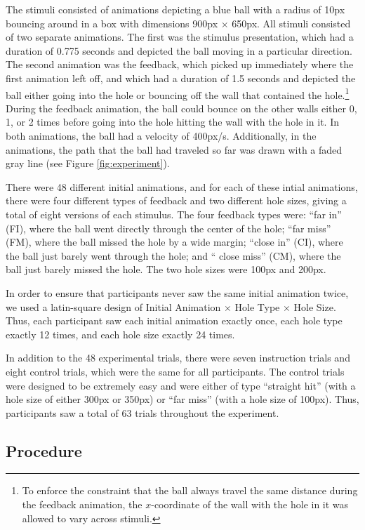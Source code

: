 \documentclass[10pt,letterpaper]{article}
\begin{document}
The stimuli consisted of animations depicting a blue ball with a radius of 10px bouncing around in a box with dimensions 900px $\times$ 650px. All stimuli consisted of two separate animations. The first was the stimulus presentation, which had a duration of 0.775 seconds and depicted the ball moving in a particular direction. The second animation was the feedback, which picked up immediately where the first animation left off, and which had a duration of 1.5 seconds and depicted the ball either going into the hole or bouncing off the wall that contained the hole.\footnote{To enforce the constraint that the ball always travel the same distance during the feedback animation, the $x$-coordinate of the wall with the hole in it was allowed to vary across stimuli.} During the feedback animation, the ball could bounce on the other walls either 0, 1, or 2 times before going into the hole hitting the wall with the hole in it. In both animations, the ball had a velocity of 400px/s. Additionally, in the animations, the path that the ball had traveled so far was drawn with a faded gray line (see Figure \ref{fig:experiment}).

There were 48 different initial animations, and for each of these intial animations, there were four different types of feedback and two different hole sizes, giving a total of eight versions of each stimulus. The four feedback types were: ``far in'' (FI), where the ball went directly through the center of the hole; ``far miss'' (FM), where the ball missed the hole by a wide margin; ``close in'' (CI), where the ball just barely went through the hole; and `` close miss'' (CM), where the ball just barely missed the hole. The two hole sizes were 100px and 200px.

In order to ensure that participants never saw the same initial animation twice, we used a latin-square design of Initial Animation $\times$ Hole Type $\times$ Hole Size. Thus, each participant saw each initial animation exactly once, each hole type exactly 12 times, and each hole size exactly 24 times.

In addition to the 48 experimental trials, there were seven instruction trials and eight control trials, which were the same for all participants. The control trials were designed to be extremely easy and were either of type ``straight hit'' (with a hole size of either 300px or 350px) or ``far miss'' (with a hole size of 100px). Thus, participants saw a total of 63 trials throughout the experiment.

\subsection{Procedure}
\end{document}
